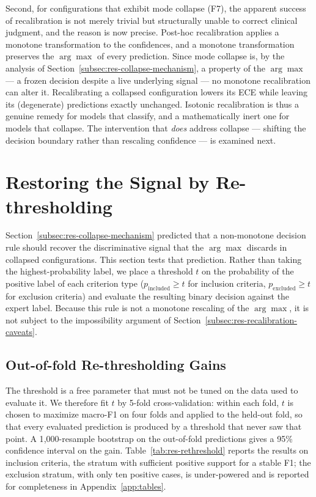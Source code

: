 Second, for configurations that exhibit mode collapse (F7), the apparent 
success of recalibration is not merely trivial but structurally unable 
to correct clinical judgment, and the reason is now precise. Post-hoc 
recalibration applies a monotone transformation to the confidences, and 
a monotone transformation preserves the $\arg\max$ of every prediction. 
Since mode collapse is, by the analysis of 
Section~\ref{subsec:res-collapse-mechanism}, a property of the $\arg\max$ 
--- a frozen decision despite a live underlying signal --- no monotone 
recalibration can alter it. Recalibrating a collapsed configuration 
lowers its ECE while leaving its (degenerate) predictions exactly 
unchanged. Isotonic recalibration is thus a genuine remedy for models 
that classify, and a mathematically inert one for models that collapse. 
The intervention that \emph{does} address collapse --- shifting the 
decision boundary rather than rescaling confidence --- is examined next.
\section{Restoring the Signal by Re-thresholding}
\label{sec:res-rethreshold}

Section~\ref{subsec:res-collapse-mechanism} predicted that a non-monotone 
decision rule should recover the discriminative signal that the 
$\arg\max$ discards in collapsed configurations. This section tests that 
prediction. Rather than taking the highest-probability label, we place a 
threshold $t$ on the probability of the positive label of each criterion 
type ($p_{\text{included}} \geq t$ for inclusion criteria, 
$p_{\text{excluded}} \geq t$ for exclusion criteria) and evaluate the 
resulting binary decision against the expert label. Because this rule is 
not a monotone rescaling of the $\arg\max$, it is not subject to the 
impossibility argument of Section~\ref{subsec:res-recalibration-caveats}.

\subsection{Out-of-fold Re-thresholding Gains}
\label{subsec:res-rethreshold-gains}

The threshold is a free parameter that must not be tuned on the data used 
to evaluate it. We therefore fit $t$ by 5-fold cross-validation: within 
each fold, $t$ is chosen to maximize macro-F1 on four folds and applied 
to the held-out fold, so that every evaluated prediction is produced by a 
threshold that never saw that point. A 1{,}000-resample bootstrap on the 
out-of-fold predictions gives a 95\% confidence interval on the gain. 
Table~\ref{tab:res-rethreshold} reports the results on inclusion 
criteria, the stratum with sufficient positive support for a stable F1; 
the exclusion stratum, with only ten positive cases, is under-powered and 
is reported for completeness in Appendix~\ref{app:tables}.

